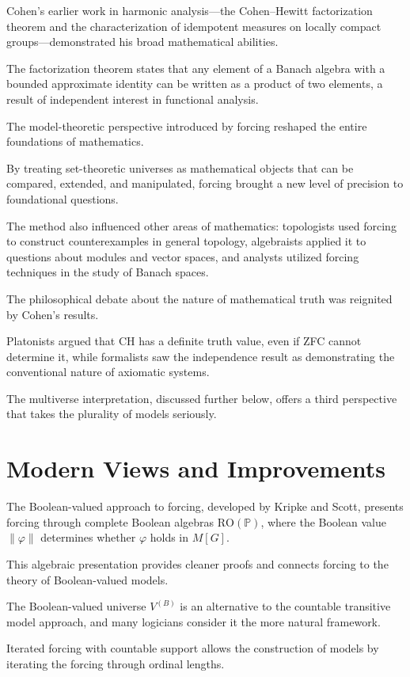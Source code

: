Cohen's earlier work in harmonic analysis---the Cohen--Hewitt factorization theorem and the characterization of idempotent measures on locally compact groups---demonstrated his broad mathematical abilities.

The factorization theorem states that any element of a Banach algebra with a bounded approximate identity can be written as a product of two elements, a result of independent interest in functional analysis.

The model-theoretic perspective introduced by forcing reshaped the entire foundations of mathematics.

By treating set-theoretic universes as mathematical objects that can be compared, extended, and manipulated, forcing brought a new level of precision to foundational questions.

The method also influenced other areas of mathematics: topologists used forcing to construct counterexamples in general topology, algebraists applied it to questions about modules and vector spaces, and analysts utilized forcing techniques in the study of Banach spaces.

The philosophical debate about the nature of mathematical truth was reignited by Cohen's results.

Platonists argued that CH has a definite truth value, even if ZFC cannot determine it, while formalists saw the independence result as demonstrating the conventional nature of axiomatic systems.

The multiverse interpretation, discussed further below, offers a third perspective that takes the plurality of models seriously.

\section{Modern Views and Improvements}

The Boolean-valued approach to forcing, developed by Kripke and Scott, presents forcing through complete Boolean algebras $\text{RO}(\mathbb{P})$, where the Boolean value $\|\varphi\|$ determines whether $\varphi$ holds in $M[G]$.

This algebraic presentation provides cleaner proofs and connects forcing to the theory of Boolean-valued models.

The Boolean-valued universe $V^{(B)}$ is an alternative to the countable transitive model approach, and many logicians consider it the more natural framework.

Iterated forcing with countable support allows the construction of models by iterating the forcing through ordinal lengths.

